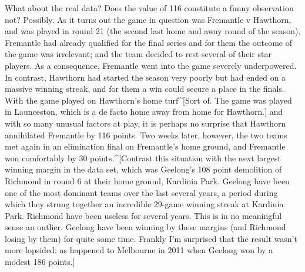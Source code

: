 What about the real data? Does the value of 116 constitute a funny observation not? Possibly. As it turns out the game in question was Fremantle v Hawthorn, and was played in round 21 (the second last home and away round of the season). Fremantle had already qualified for the final series and for them the outcome of the game was irrelevant; and the team decided to rest several of their star players. As a consequence, Fremantle went into the game severely underpowered. In contrast, Hawthorn had started the season very poorly but had ended on a massive winning streak, and for them a win could secure a place in the finals. With the game played on Hawthorn's home turf^[Sort of. The game was played in Launceston, which is a de facto home away from home for Hawthorn.] and with so many unusual factors at play, it is perhaps no surprise that Hawthorn annihilated Fremantle by 116 points. Two weeks later, however, the two teams met again in an elimination final on Fremantle's home ground, and Fremantle won comfortably by 30 points.^[Contrast this situation with the next largest winning margin in the data set, which was Geelong's 108 point demolition of Richmond in round 6 at their home ground, Kardinia Park. Geelong have been one of the most dominant teams over the last several years, a period during which they strung together an incredible 29-game winning streak at Kardinia Park. Richmond have been useless for several years. This is in no meaningful sense an outlier. Geelong have been winning by these margins (and Richmond losing by them) for quite some time. Frankly I'm surprised that the result wasn't more lopsided: as happened to Melbourne in 2011 when Geelong won by a modest 186 points.]

